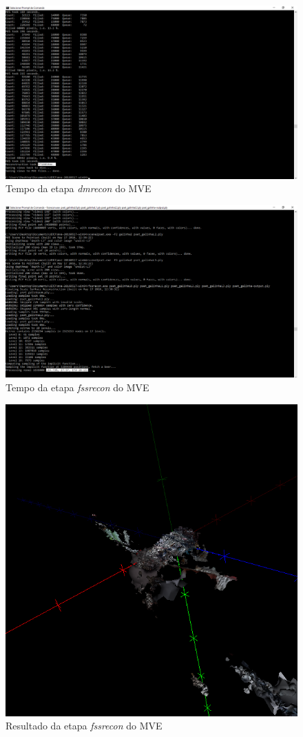 \begin{figure}[!h]
	\centering
	\includegraphics[width=0.5\linewidth]{figs/galinhadmreconmve.png}
	\caption{%
	Tempo da etapa \emph{dmrecon} do MVE
	}\label{fig:dmrecon1}
\end{figure}

\begin{figure}[!h]
	\centering
	\includegraphics[width=0.5\linewidth]{figs/mvefssrecongalinha.png}
	\caption{%
	Tempo da etapa \emph{fssrecon} do MVE
	}\label{fig:fssrecon}
\end{figure}

\begin{figure}[!h]
	\centering
	\includegraphics[width=0.5\linewidth]{figs/galinhadmr.png}
	\caption{%
	Resultado da etapa \emph{fssrecon} do MVE
	}\label{fig:galinhaFssr}
\end{figure}

